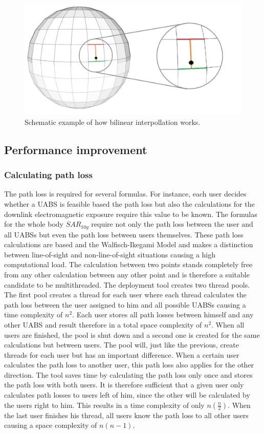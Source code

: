 \begin{figure}[H]
\centering
  \includegraphics[width=\textwidth/3*2]{../images/3Dimages/globev2.jpg}
  \caption{Schematic example of how bilinear interpollation works.}
  \label{fig:globe}
\end{figure}

\subsection{Performance improvement}
\subsubsection{Calculating path loss}
The path loss is required for several formulas. For instance, each user decides whether a \gls{UABS} is feasible based 
the path loss but also the calculations for the downlink electromagnetic 
exposure require this value to be known. The formulas for the whole body $SAR_{10g}$ require not only the path loss between the user
and all \gls{UABS}s but even the path loss between users themselves. These path loss calculations are based and the Walfisch-Ikegami 
Model and makes a distinction between line-of-sight and non-line-of-sight situations causing a high computational load. The calculation between two points stands completely free from
any other calculation between any other point and is therefore a suitable candidate to be multithreaded. The deployment tool creates two thread pools.
The first pool creates a thread for each user where each thread calculates the path loss between the user assigned to him and all possible \gls{UABS}s causing a time complexity of $n^2$.
Each user stores all path losses between himself and any other \gls{UABS} and result therefore in a total space complexity of $n^2$.
When all users are finished, the pool is shut down and a second one is created for the same calculations but between users.
The pool will, just like the previous, create threads for each user but has an important difference.
When a certain user calculates the path loss to another user, this path loss also applies for the other direction. The tool saves time by calculating the path loss only 
once and stores the path loss with both users. It is therefore sufficient that a given user only calculates path losses to users left of him, since the other will 
be calculated by the users right to him. This results in a time complexity of only $n(\frac{n}{2})$. When the last user finishes his thread, all users know the path loss to all other users causing 
a space complexity of $n(n-1)$.

